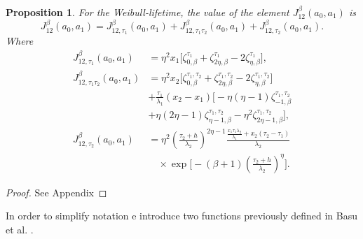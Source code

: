 \documentclass{article}
\newtheorem{proposition}[theorem]{Proposition}
\begin{document}
\begin{proposition}
For the Weibull-lifetime, the value of the element $J_{12}^{\beta}(a_0,a_1)$ is
\begin{equation*}
J_{12}^{\beta}(a_0,a_1)=J_{12,\tau_1}^{\beta}(a_0,a_1)+J_{12,\tau_1\tau_2}^{\beta}(a_0,a_1)+J_{12,\tau_2}^{\beta}(a_0,a_1).
\end{equation*}
Where
\begin{equation}
\begin{aligned}
J_{12,\tau_1}^{\beta}(a_0,a_1)
&=\eta^2 x_1
\Big[
\zeta_{0,\beta}^{\tau_1}
+\zeta_{2\eta,\beta}^{\tau_1}
-2\zeta_{\eta,\beta}^{\tau_1}
\Big],
\\
J_{12,\tau_1\tau_2}^{\beta}(a_0,a_1)
&=\eta^2 x_2
\Big[
\zeta_{0,\beta}^{\tau_1,\tau_2}
+\zeta_{2\eta,\beta}^{\tau_1,\tau_2}
-2\zeta_{\eta,\beta}^{\tau_1,\tau_2}
\Big]
\\
&
+\frac{\tau_1}{\lambda_1}(x_2-x_1)
\Big[
-\eta(\eta-1)\zeta_{-1,\beta}^{\tau_1,\tau_2}
\\
&
+\eta(2\eta-1)\zeta_{\eta-1,\beta}^{\tau_1,\tau_2}-\eta^2\zeta_{2\eta-1,\beta}^{\tau_1,\tau_2}
\Big],
\\
J_{12,\tau_2}^{\beta}(a_0,a_1)
&=\eta^2
\left(
\frac{\tau_2+h}{\lambda_2}
\right)^{2\eta-1}
\frac{\frac{x_1\tau_1\lambda_2}{\lambda_1}
+x_2(\tau_2-\tau_1)}{\lambda_2}
\\
&\quad\times
\exp\!\Bigg[
-(\beta+1)
\left(
\frac{\tau_2+h}{\lambda_2}
\right)^{\eta}
\Bigg].
\end{aligned}  \nonumber
\end{equation}

\end{proposition}
\begin{proof}
See Appendix
\end{proof}
In order to simplify notation e introduce two functions previously defined in Basu et al. \cite{basu2017}.
\end{document}
